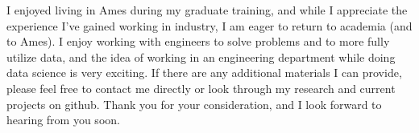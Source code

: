 \documentclass[12pt, letterpaper, sans]{moderncv}
\begin{document}



I enjoyed living in Ames during my graduate training, and while I appreciate the experience I've gained working in industry, I am eager to return to academia (and to Ames). I enjoy working with engineers to solve problems and to more fully utilize data, and the idea of working in an engineering department while doing data science is very exciting. If there are any additional materials I can provide, please feel free to contact me directly or look through my research and current projects on github. Thank you for your consideration, and I look forward to hearing from you soon.  

\vspace{1cm}
\makeletterclosing

\end{document}
